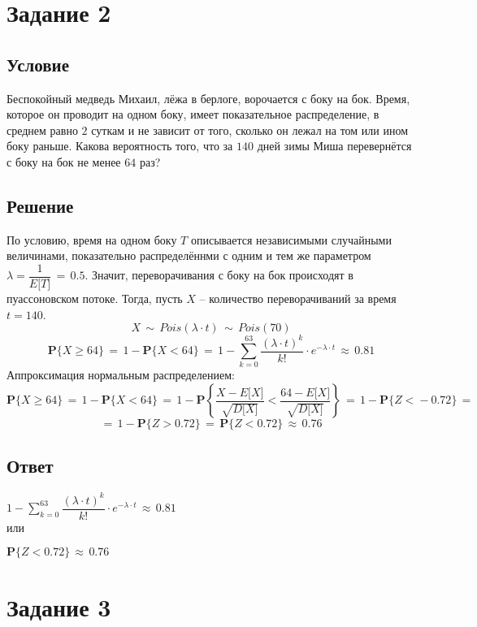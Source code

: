 \documentclass{article}
\begin{document}
\section*{Задание 2}
\subsection*{Условие}
Беспокойный медведь Михаил, лёжа в берлоге, ворочается с боку на бок. Время, которое он проводит на одном боку, имеет показательное распределение, в среднем равно $ 2 $ суткам и не зависит от того, сколько он лежал на том или ином боку раньше. Какова вероятность того, что за $ 140 $ дней зимы Миша перевернётся с боку на бок не менее $ 64 $ раз?
\subsection*{Решение}
По условию, время на одном боку $ T $ описывается независимыми случайными величинами, показательно распределённми с одним и тем же параметром $ \lambda \! = \! \dfrac{1}{E \big[ T \big]} \, = \, 0.5 $. Значит, переворачивания с боку на бок происходят в пуассоновском потоке. Тогда, пусть $ X $ -- количество переворачиваний за время $ t \! = \! 140 $.
\[ X \, \sim \, Pois(\lambda \! \cdot \! t) \, \sim \, Pois(70) \]
\[ \mathbf{P} \big\{ X \! \geqslant \! 64 \big\} \, = \, 1 \! - \! \mathbf{P} \big\{ X \! < \! 64 \big\} \, = \, 1 \! - \! \sum\limits_{k=0}^{63} \dfrac{(\lambda \! \cdot \! t)^k}{k!} \! \cdot \! e^{-\lambda \cdot t} \, \approx \, 0.81 \]
Аппроксимация нормальным распределением:
\[ \mathbf{P} \big\{ X \! \geqslant \! 64 \big\} \, = \, 1 \! - \! \mathbf{P} \big\{ X \! < \! 64 \big\} \, = \, 1 \! - \! \mathbf{P} \left\{ \dfrac{X \! - \! E \big[ X \big]}{\sqrt{D \big[ X \big]}} \! < \! \dfrac{64 \! - \! E \big[ X \big]}{\sqrt{D \big[ X \big]}} \right\} \, = \, 1 \! - \! \mathbf{P} \big\{ Z \! < \! -0.72 \big\} \, = \]
\[ = \, 1 \! - \! \mathbf{P} \big\{ Z \! > \! 0.72 \big\} \, = \, \mathbf{P} \big\{ Z \! < \! 0.72 \big\} \, \approx \, 0.76 \]
\subsection*{Ответ}
$ 1 \! - \! \sum\limits_{k=0}^{63} \dfrac{(\lambda \! \cdot \! t)^k}{k!} \! \cdot \! e^{-\lambda \cdot t} \, \approx \, 0.81 $\\
или\par
$ \mathbf{P} \big\{ Z \! < \! 0.72 \big\} \, \approx \, 0.76 $
\section*{Задание 3}
\end{document}
